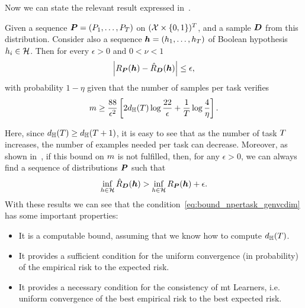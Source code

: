 Now we can state the relevant result expressed in~\citet[Corollary~13]{baxter2000model}.
\begin{theorem}\label{th:baxter_vcdim}
    Given a sequence $\bm{P} = (P_1, \ldots, P_T)$ on $(\mathcal{X} \times \left\{0, 1\right\})^T$, and a sample $\bm{D}$ from this distribution. Consider also a sequence $\bm{h} = (h_1, \ldots, h_T)$ of Boolean hypothesis $h_i \in \mathcal{H}$. Then for every $\epsilon > 0$ and $0 < \nu < 1$
\begin{equation}
    \nonumber
    \left|R_{\bm{P}}(\bm{h}) - \hat{R}_{\bm{D}}(\bm{h})\right| \leq \epsilon,
\end{equation}
with probability $1 - \eta$ given that the number of samples per task verifies
\begin{equation}
    \label{eq:bound_npertask_genvcdim}
    \npertask \geq \frac{88}{\epsilon^2} \left[2 d_\hypspacef(\ntasks) \log \frac{22}{\epsilon} + \frac{1}{\ntasks}\log\frac{4}{\eta} \right] .
\end{equation}
\end{theorem}
Here, since $d_{\mathbb{H}}(T) \geq d_{\mathbb{H}}(T+1)$, it is easy to see that as the number of task $T$ increases, the number of examples needed per task can decrease. 
Moreover, as shown in~\cite[Theorem~14]{baxter2000model}, if this bound on $m$ is not fulfilled, then, for any $\epsilon > 0$, we can always find a sequence of distributions $\bm{P}$ such that
\begin{equation}
    \nonumber
    \inf_{h \in \mathcal{H}} \hat{R}_{\bm{D}}(\bm{h}) > \inf_{h \in \mathcal{H}} R_{\bm{P}}(\bm{h}) + \epsilon .
\end{equation}
With these results we can see that the condition~\eqref{eq:bound_npertask_genvcdim} has some important properties:
\begin{itemize}
    \item It is a computable bound, assuming that we know how to compute $d_{\mathbb{H}}(T)$.
    \item It provides a sufficient condition for the uniform convergence (in probability) of the empirical risk to the expected risk.
    \item It provides a necessary condition for the consistency of \acrshort{mt} Learners, i.e. uniform convergence of the best empirical risk to the best expected risk.
\end{itemize}

